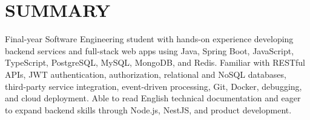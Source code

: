 \section{SUMMARY}
\noindent Final-year Software Engineering student with hands-on experience developing backend services and full-stack web apps using Java, Spring Boot, JavaScript, TypeScript, PostgreSQL, MySQL, MongoDB, and Redis. Familiar with RESTful APIs, JWT authentication, authorization, relational and NoSQL databases, third-party service integration, event-driven processing, Git, Docker, debugging, and cloud deployment. Able to read English technical documentation and eager to expand backend skills through Node.js, NestJS, and product development.
